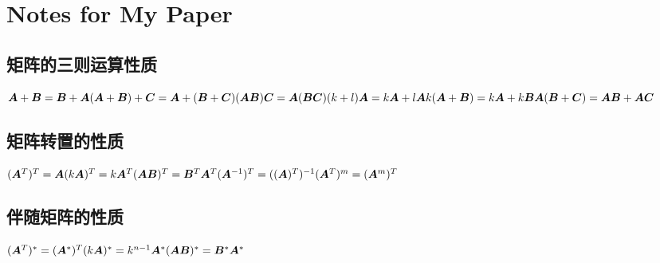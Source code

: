 \documentclass[12pt]{article}
\begin{document}
\section*{Notes for My Paper}
\subsection{矩阵的三则运算性质}
$
\bm{A} + \bm{B} = \bm{B} + \bm{A}
\\ \\
(\bm{A} + \bm{B}) + \bm{C} = \bm{A} + (\bm{B}+\bm{C})
\\ \\
(\bm{A}\bm{B})\bm{C}=\bm{A}(\bm{B}\bm{C})
\\ \\
(k+l)\bm{A}=k\bm{A}+l\bm{A}
\\ \\
k(\bm{A}+\bm{B})=k\bm{A}+k\bm{B}
\\ \\
\bm{A}(\bm{B}+\bm{C})=\bm{A}\bm{B}+\bm{A}\bm{C}
\\ \\
$
\subsection{矩阵转置的性质}
\(
(\bm{A}^T)^T=\bm{A}
\\ \\
(k \bm{A})^T=k \bm{A}^T \\ \\
(\bm{A}\bm{B})^T=\bm{B}^T \bm{A}^T \\ \\
(\bm{A}^{-1})^T=((\bm{A})^T)^{-1} \\ \\
(\bm{A}^T)^m=(\bm{A}^m)^T \\ \\
\)

\subsection{伴随矩阵的性质}
\(
(\bm{A}^T)^*=(\bm{A}^*)^T \\ \\
(k \bm{A})^*=k^{n-1}\bm{A}^* \\ \\
(\bm{A}\bm{B})^*=\bm{B}^*\bm{A}^* \\ \\
\)
\end{document}
